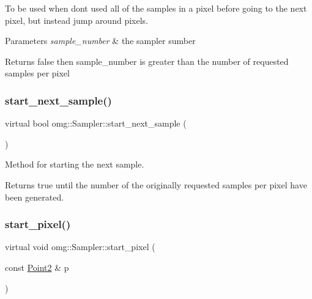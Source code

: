 To be used when don\textquotesingle{}t used all of the samples in a pixel before going to the next pixel, but instead jump around pixels. 


\begin{DoxyParams}{Parameters}
{\em sample\+\_\+number} & the sampler sumber \\
\hline
\end{DoxyParams}
\begin{DoxyReturn}{Returns}
false then sample\+\_\+number is greater than the number of requested samples per pixel 
\end{DoxyReturn}
\mbox{\label{classomg_1_1_sampler_ae2b33610cc24dced31dd8d15b4778cba}} 
\subsubsection{\texorpdfstring{start\_next\_sample()}{start\_next\_sample()}}
{\footnotesize\ttfamily virtual bool omg\+::\+Sampler\+::start\+\_\+next\+\_\+sample (\begin{DoxyParamCaption}{ }\end{DoxyParamCaption})\hspace{0.3cm}{\ttfamily [virtual]}}



Method for starting the next sample. 

\begin{DoxyReturn}{Returns}
true until the number of the originally requested samples per pixel have been generated. 
\end{DoxyReturn}
\mbox{\label{classomg_1_1_sampler_aa4a2172276ec0bec3e717b7e035872d5}} 
\subsubsection{\texorpdfstring{start\_pixel()}{start\_pixel()}}
{\footnotesize\ttfamily virtual void omg\+::\+Sampler\+::start\+\_\+pixel (\begin{DoxyParamCaption}\item[{const \mbox{\hyperlink{namespaceomg_a18e42fb7bbc4159e9137145b866ec578}{Point2}} \&}]{p }\end{DoxyParamCaption})\hspace{0.3cm}{\ttfamily [pure virtual]}}



